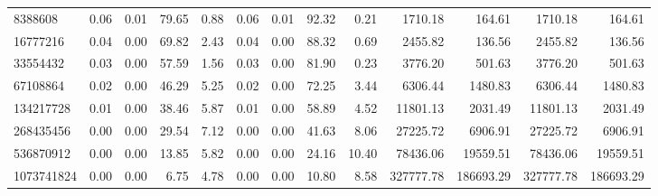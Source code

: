 \begin{tabular}{lrrrrrrrrrrrr}
8388608 & 0.06 & 0.01 & 79.65 & 0.88 & 0.06 & 0.01 & 92.32 & 0.21 & 1710.18 & 164.61 & 1710.18 & 164.61 \\
16777216 & 0.04 & 0.00 & 69.82 & 2.43 & 0.04 & 0.00 & 88.32 & 0.69 & 2455.82 & 136.56 & 2455.82 & 136.56 \\
33554432 & 0.03 & 0.00 & 57.59 & 1.56 & 0.03 & 0.00 & 81.90 & 0.23 & 3776.20 & 501.63 & 3776.20 & 501.63 \\
67108864 & 0.02 & 0.00 & 46.29 & 5.25 & 0.02 & 0.00 & 72.25 & 3.44 & 6306.44 & 1480.83 & 6306.44 & 1480.83 \\
134217728 & 0.01 & 0.00 & 38.46 & 5.87 & 0.01 & 0.00 & 58.89 & 4.52 & 11801.13 & 2031.49 & 11801.13 & 2031.49 \\
268435456 & 0.00 & 0.00 & 29.54 & 7.12 & 0.00 & 0.00 & 41.63 & 8.06 & 27225.72 & 6906.91 & 27225.72 & 6906.91 \\
536870912 & 0.00 & 0.00 & 13.85 & 5.82 & 0.00 & 0.00 & 24.16 & 10.40 & 78436.06 & 19559.51 & 78436.06 & 19559.51 \\
1073741824 & 0.00 & 0.00 & 6.75 & 4.78 & 0.00 & 0.00 & 10.80 & 8.58 & 327777.78 & 186693.29 & 327777.78 & 186693.29 \\
\bottomrule
\end{tabular}
